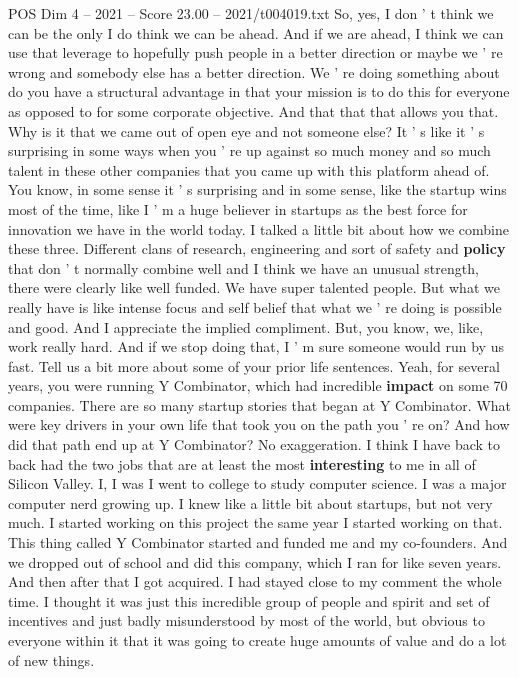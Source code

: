\begin{textsample}{POS Dim 4 – 2021 – Score 23.00 – 2021/t004019.txt}
So, yes, I don ' t think we can be the only I do think we can be ahead.
And if we are ahead, I think we can use that leverage to hopefully push people in a better direction or maybe we ' re wrong and somebody else has a better direction.
We ' re doing something about do you have a structural advantage in that your mission is to do this for everyone as opposed to for some corporate objective.
And that that that allows you that.
Why is it that we came out of open eye and not someone else?
It ' s like it ' s surprising in some ways when you ' re up against so much money and so much talent in these other companies that you came up with this platform ahead of.
You know, in some sense it ' s surprising and in some sense, like the startup wins most of the time, like I ' m a huge believer in startups as the best force for innovation we have in the world today.
I talked a little bit about how we combine these three.
Different clans of research, engineering and sort of safety and \textbf{policy} that don ' t normally combine well and I think we have an unusual strength, there were clearly like well funded.
We have super talented people.
But what we really have is like intense focus and self belief that what we ' re doing is possible and good.
And I appreciate the implied compliment.
But, you know, we, like, work really hard.
And if we stop doing that, I ' m sure someone would run by us fast.
Tell us a bit more about some of your prior life sentences.
Yeah, for several years, you were running Y Combinator, which had incredible \textbf{impact} on some 70 companies.
There are so many startup stories that began at Y Combinator.
What were key drivers in your own life that took you on the path you ' re on?
And how did that path end up at Y Combinator?
No exaggeration.
I think I have back to back had the two jobs that are at least the most \textbf{interesting} to me in all of Silicon Valley.
I, I was I went to college to study computer science.
I was a major computer nerd growing up.
I knew like a little bit about startups, but not very much.
I started working on this project the same year I started working on that.
This thing called Y Combinator started and funded me and my co-founders.
And we dropped out of school and did this company, which I ran for like seven years.
And then after that I got acquired.
I had stayed close to my comment the whole time.
I thought it was just this incredible group of people and spirit and set of incentives and just badly misunderstood by most of the world, but obvious to everyone within it that it was going to create huge amounts of value and do a lot of new things.

\end{textsample}
